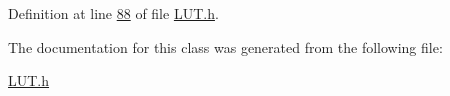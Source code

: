 Definition at line \hyperlink{_l_u_t_8h_source_l00088}{88} of file \hyperlink{_l_u_t_8h_source}{L\+U\+T.\+h}.



The documentation for this class was generated from the following file\+:\begin{DoxyCompactItemize}
\item 
\hyperlink{_l_u_t_8h}{L\+U\+T.\+h}\end{DoxyCompactItemize}
